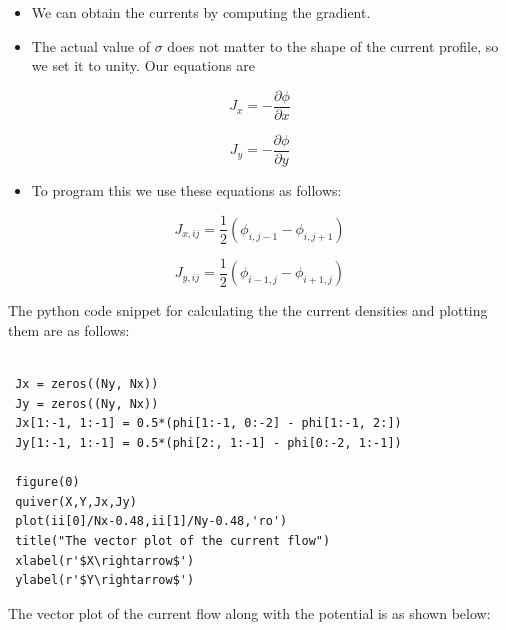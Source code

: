 \documentclass[11pt, a4paper]{article}
\begin{document}
\begin{itemize}
\item
  We can obtain the currents by computing the gradient.
\item
  The actual value of \(\sigma\) does not matter to the shape of the
  current profile, so we set it to unity. Our equations are
\end{itemize}

\begin{equation}
    J_x = -\frac{\partial \phi}{\partial x} 
  \end{equation}

\begin{equation}
    J_y = -\frac{\partial \phi}{\partial y} 
  \end{equation}

\begin{itemize}
\item
  To program this we use these equations as follows:
\end{itemize}

\begin{equation}
        J_{x,ij} = \frac{1}{2}(\phi_{i,j-1} - \phi_{i,j+1}) 
    \end{equation}

\begin{equation}
        J_{y,ij} = \frac{1}{2}(\phi_{i-1,j} - \phi_{i+1,j}) 
    \end{equation}
  
The python code snippet for calculating the the current densities and plotting them are as follows:
   
  
\begin{verbatim}

 Jx = zeros((Ny, Nx))
 Jy = zeros((Ny, Nx))
 Jx[1:-1, 1:-1] = 0.5*(phi[1:-1, 0:-2] - phi[1:-1, 2:])
 Jy[1:-1, 1:-1] = 0.5*(phi[2:, 1:-1] - phi[0:-2, 1:-1])
 
 figure(0)
 quiver(X,Y,Jx,Jy)
 plot(ii[0]/Nx-0.48,ii[1]/Ny-0.48,'ro')
 title("The vector plot of the current flow")
 xlabel(r'$X\rightarrow$')
 ylabel(r'$Y\rightarrow$')
  \end{verbatim}
  \newpage
The vector plot of the current flow along with the potential is as shown below:
\end{document}

